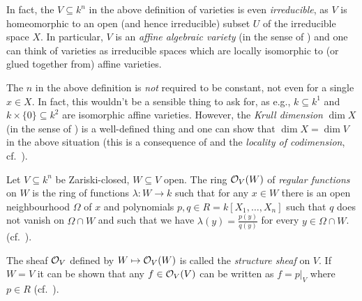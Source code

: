 \documentclass[a4paper,parskip=half,numbers=enddot, DIV=12]{scrreprt}
\begin{document}
	\begin{rem*}
		\begin{alphanumerate}
			\item In fact, the $V\subseteq k^n$ in the above definition of varieties is even \emph{irreducible}, as $V$ is homeomorphic to an open (and hence irreducible) subset $U$ of the irreducible space $X$. In particular, $V$ is an \emph{affine algebraic variety} (in the sense of \cite[Definition~2.2.1]{alg1}) and one can think of varieties as irreducible spaces which are locally isomorphic to (or glued together from) affine varieties.
			\item The $n$ in the above definition is \emph{not} required to be constant, not even for a single $x\in X$. In fact, this wouldn't be a sensible thing to ask for, as e.g., $k\subseteq k^1$ and $k\times\{0\}\subseteq k^2$ are isomorphic affine varieties. However, the \emph{Krull dimension} $\dim X$ (in the sense of \cite[Definition~2.1.4]{alg1}) is a well-defined thing and one can show that $\dim X=\dim V$ in the above situation (this is a consequence of \cite[Theorem~6]{alg1} and the \emph{locality of codimension}, cf.\ \cite[Remark~2.1.3]{alg1}).
		\end{alphanumerate}
	\end{rem*}
	\begin{example}
		    Let $V\subseteq k^n$ be Zariski-closed, $W\subseteq V$ open. The ring $\mathcal{O}_V(W)$ of \emph{regular functions} on $W$ is the ring of functions $\lambda\colon W\to k$ such that for any $x\in W$ there is an open neighbourhood $\Omega$ of $x$ and polynomials $p,q\in R= k[X_1,\ldots,X_n]$ such that $q$ does not vanish on $\Omega\cap W$ and such that we have $\lambda(y) = \frac{p(y)}{q(y)}$ for every $y\in \Omega\cap W$. (cf.\ \cite[Definition 2.2.2]{alg1}).
		     
		     The sheaf $\mathcal{O}_V$ defined by $W\mapsto \mathcal{O}_V(W)$ is called the \emph{structure sheaf} on $V$. If $W=V$ it can be shown that any $f\in \mathcal{O}_V(V)$ can be written as $f=p|_V$ where $p\in R$ (cf.\ \cite[Proposition 2.2.2]{alg1}).
	\end{example}
	    
\end{document}
